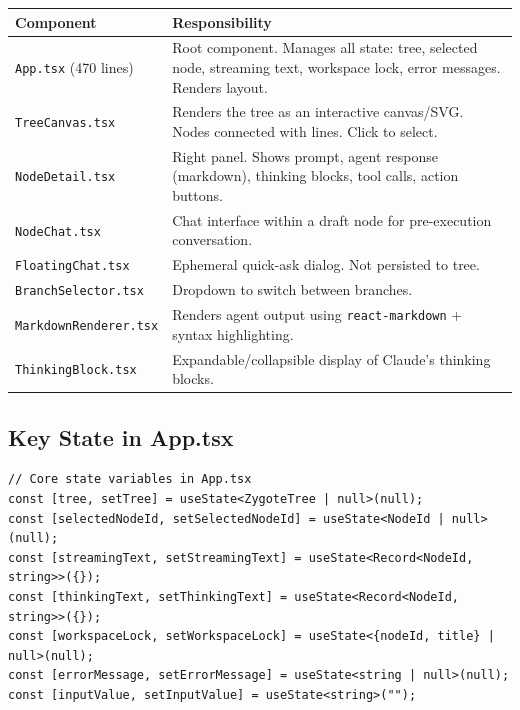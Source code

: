 \documentclass[12pt, a4paper]{article}
\begin{document}
\begin{table}[H]
\centering
\small
\begin{tabular}{@{}p{4cm}p{9.5cm}@{}}
\toprule
\textbf{Component} & \textbf{Responsibility} \\
\midrule
\texttt{App.tsx} (470 lines) & Root component. Manages all state: tree, selected node, streaming text, workspace lock, error messages. Renders layout. \\
\texttt{TreeCanvas.tsx} & Renders the tree as an interactive canvas/SVG. Nodes connected with lines. Click to select. \\
\texttt{NodeDetail.tsx} & Right panel. Shows prompt, agent response (markdown), thinking blocks, tool calls, action buttons. \\
\texttt{NodeChat.tsx} & Chat interface within a draft node for pre-execution conversation. \\
\texttt{FloatingChat.tsx} & Ephemeral quick-ask dialog. Not persisted to tree. \\
\texttt{BranchSelector.tsx} & Dropdown to switch between branches. \\
\texttt{MarkdownRenderer.tsx} & Renders agent output using \texttt{react-markdown} + syntax highlighting. \\
\texttt{ThinkingBlock.tsx} & Expandable/collapsible display of Claude's thinking blocks. \\
\bottomrule
\end{tabular}
\end{table}

\subsection{Key State in App.tsx}

\begin{lstlisting}
// Core state variables in App.tsx
const [tree, setTree] = useState<ZygoteTree | null>(null);
const [selectedNodeId, setSelectedNodeId] = useState<NodeId | null>(null);
const [streamingText, setStreamingText] = useState<Record<NodeId, string>>({});
const [thinkingText, setThinkingText] = useState<Record<NodeId, string>>({});
const [workspaceLock, setWorkspaceLock] = useState<{nodeId, title} | null>(null);
const [errorMessage, setErrorMessage] = useState<string | null>(null);
const [inputValue, setInputValue] = useState<string>("");
\end{lstlisting}

\newpage

\end{document}
